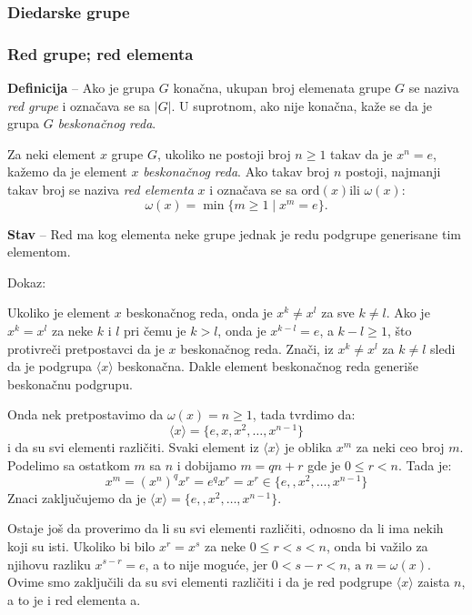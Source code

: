 \documentclass[a4paper,12pt]{article}
\begin{document}
\subsubsection{Diedarske grupe}

\subsubsection{Red grupe; red elementa}

\textbf{Definicija} -- Ako je grupa \( G \) konačna, ukupan broj elemenata grupe \( G \) se naziva \emph{red grupe} i označava se sa \( |G| \).
U suprotnom, ako nije konačna, kaže se da je grupa \( G \) \emph{beskonačnog reda}.

Za neki element \( x \) grupe \( G\), ukoliko ne postoji broj \( n \geq 1 \) takav da je \( x^n = e \), kažemo da je element \( x \) \emph{beskonačnog reda}.
Ako takav broj \( n \) postoji, najmanji takav broj se naziva \emph{red elementa} \( x \) i označava se sa \( \text{ord}(x) \text{ili } \omega(x) \):
\[ \omega(x) = \min \{ m \geq 1\mid x^m = e \}. \]

\medskip
\textbf{Stav} -- Red ma kog elementa neke grupe jednak je redu podgrupe generisane tim elementom.

Dokaz:

Ukoliko je element \( x \) beskonačnog reda, onda je \( x^k \neq x^l \) za sve \(k \neq l \). Ako je \( x^k = x^l \)
za neke $k$ i $l$ pri čemu je \( k > l \), onda je \( x^{k-l} = e \), a \( k - l \geq 1 \), što protivreči pretpostavci da je $x$ beskonačnog reda.
Znači, iz  \( x^k \neq x^l \) za \( k \neq l \) sledi da je podgrupa \( \langle x \rangle \) beskonačna. Dakle element beskonačnog reda generiše beskonačnu podgrupu.

Onda nek pretpostavimo da \( \omega(x) = n \geq 1 \), tada tvrdimo da:
\[
  \langle x \rangle = \{e, x, x^2, \dots, x^{n-1} \}
\]
i da su svi elementi različiti. Svaki element iz \( \langle x \rangle \) je oblika $x^m$ za neki ceo broj $m$. Podelimo sa ostatkom $m$ sa $n$ i dobijamo \( m = qn + r \) gde je \( 0 \leq r < n\).
Tada je:
\[
  x^m = (x^n)^qx^r = e^qx^r = x^r \in \{e, , x^2, \dots, x^{n-1} \}
\]
Znaci zaključujemo da je \( \langle x \rangle = \{e, , x^2, \dots, x^{n-1} \} \).

Ostaje još da proverimo da li su svi elementi različiti, odnosno da li ima nekih koji su isti. Ukoliko bi bilo \( x^r = x^s \) za neke \( 0 \leq r < s < n \),
onda bi važilo za njihovu razliku \( x^{s-r} = e \), a to nije moguće, jer \( 0 < s - r < n \text{, a } n = \omega(x) \).
Ovime smo zaključili da su svi elementi različiti i da je red podgrupe \( \langle x \rangle \) zaista $n$, a to je i red elementa a.
\end{document}
